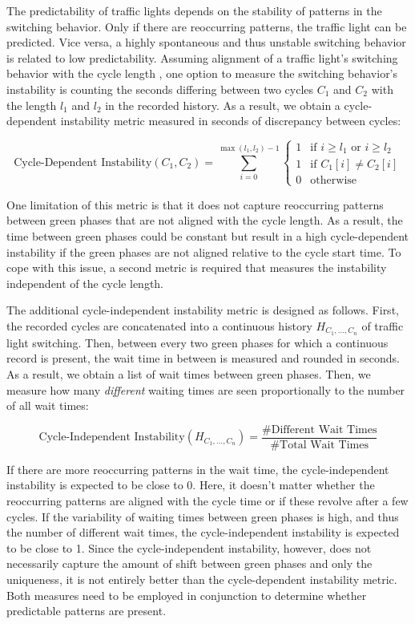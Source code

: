 The predictability of traffic lights depends on the stability of patterns in the switching behavior. Only if there are reoccurring patterns, the traffic light can be predicted. Vice versa, a highly spontaneous and thus unstable switching behavior is related to low predictability. Assuming alignment of a traffic light's switching behavior with the cycle length \cite{protschky_extensive_2014}, one option to measure the switching behavior's instability is counting the seconds differing between two cycles $C_1$ and $C_2$ with the length $l_1$ and $l_2$ in the recorded history. As a result, we obtain a cycle-dependent instability metric measured in seconds of discrepancy between cycles:

\begin{equation} \text{Cycle-Dependent Instability}(C_1, C_2) =  \sum_{i=0}^{\max(l_1, l_2)-1} \left\{
\begin{array}{ll}
1 & \text{if } i \geq l_1 \text{ or } i \geq l_2 \\
1 & \text{if } C_1[i] \neq C_2[i] \\
0 & \text{otherwise}
\end{array} \right.\end{equation}

One limitation of this metric is that it does not capture reoccurring patterns between green phases that are not aligned with the cycle length. As a result, the time between green phases could be constant but result in a high cycle-dependent instability if the green phases are not aligned relative to the cycle start time. To cope with this issue, a second metric is required that measures the instability independent of the cycle length. 

The additional cycle-independent instability metric is designed as follows. First, the recorded cycles are concatenated into a continuous history $H_{C_1, \dots, C_n}$ of traffic light switching. Then, between every two green phases for which a continuous record is present, the wait time in between is measured and rounded in seconds. As a result, we obtain a list of wait times between green phases. Then, we measure how many \textit{different} waiting times are seen proportionally to the number of all wait times:

\begin{equation}
\text{Cycle-Independent Instability}(H_{C_1, \dots, C_n}) = \frac{\text{\# Different Wait Times}}{\text{\# Total Wait Times}}
\end{equation}

If there are more reoccurring patterns in the wait time, the cycle-independent instability is expected to be close to 0. Here, it doesn't matter whether the reoccurring patterns are aligned with the cycle time or if these revolve after a few cycles. If the variability of waiting times between green phases is high, and thus the number of different wait times, the cycle-independent instability is expected to be close to 1. Since the cycle-independent instability, however, does not necessarily capture the amount of shift between green phases and only the uniqueness, it is not entirely better than the cycle-dependent instability metric. Both measures need to be employed in conjunction to determine whether predictable patterns are present.

